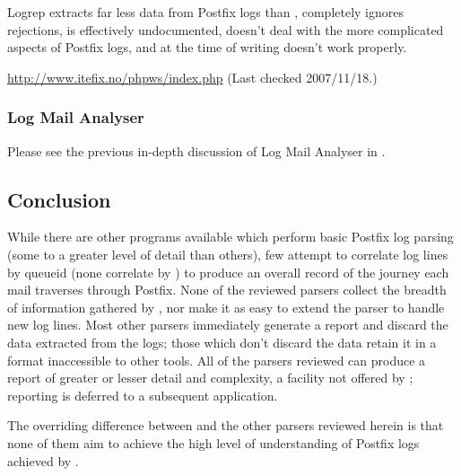 Logrep extracts far less data from Postfix logs than \parsername{},
completely ignores rejections, is effectively undocumented, doesn't deal
with the more complicated aspects of Postfix logs, and at the time of
writing doesn't work properly.

\url{http://www.itefix.no/phpws/index.php} \newline (Last checked
2007/11/18.)

\subsubsection{Log Mail Analyser}

Please see the previous in-depth discussion of Log Mail Analyser in
.


\subsection{Conclusion}

While there are other programs available which perform basic Postfix log
parsing (some to a greater level of detail than others), few attempt to
correlate log lines by queueid (none correlate by \pid{}) to produce an
overall record of the journey each mail traverses through Postfix.  None of
the reviewed parsers collect the breadth of information gathered by
\parsername{}, nor make it as easy to extend the parser to handle new log
lines.  Most other parsers immediately generate a report and discard the
data extracted from the logs; those which don't discard the data retain it
in a format inaccessible to other tools.  All of the parsers reviewed can
produce a report of greater or lesser detail and complexity, a facility not
offered by \parsername{}; reporting is deferred to a subsequent
application.

The overriding difference between \parsername{} and the other parsers
reviewed herein is that none of them aim to achieve the high level of
understanding of Postfix logs achieved by \parsername{}.
